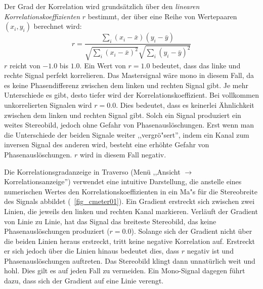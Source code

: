 Der Grad der Korrelation wird grundsätzlich über den \emph{linearen Korrelationskoeffizienten} $r$ bestimmt, der über eine Reihe von Wertepaaren $(x_i,y_i)$ berechnet wird:
\[
r = \frac{\sum\limits_{i}(x_i - \bar{x})(y_i - \bar{y})}{\sqrt{\sum\limits_{i}(x_i - \bar{x})^2} \sqrt{\sum\limits_{i}(y_i - \bar{y})^2}}
\]
$r$ reicht von $-1.0$ bis $1.0$. Ein Wert von $r = 1.0$ bedeutet, dass das linke und rechte Signal perfekt korrelieren. Das Mastersignal wäre mono in diesem Fall, da es keine Phasendifferenz zwischen dem linken und rechten Signal gibt. Je mehr Unterschiede es gibt, desto tiefer wird der Korrelationskoeffizient. Bei vollkommen unkorrelierten Signalen wird $r = 0.0$. Dies bedeutet, dass es keinerlei Ähnlichkeit zwischen dem linken und rechten Signal gibt. Solch ein Signal produziert ein weites Stereobild, jedoch ohne Gefahr von Phasenauslöschungen. Erst wenn man die Unterschiede der beiden Signale weiter ,,vergrö"sert'', indem ein Kanal zum inversen Signal des anderen wird, besteht eine erhöhte Gefahr von Phasenauslöschungen. $r$ wird in diesem Fall negativ.

Die Korrelationsgradanzeige in Traverso (Menü ,,Ansicht $\rightarrow$ Korrelationsanzeige'') verwendet eine intuitive Darstellung, die anstelle eines numerischen Wertes den Korrelationskoeffizienten in ein Ma"s für die Stereobreite des Signals abbildet (\FigB\ \ref{fig_cmeter01}). Ein Gradient erstreckt sich zwischen zwei Linien, die jeweils den linken und rechten Kanal markieren. Verläuft der Gradient von Linie zu Linie, hat das Signal das breiteste Stereobild, das keine Phasenauslöschungen produziert ($r = 0.0$). Solange sich der Gradient nicht über die beiden Linien heraus erstreckt, tritt keine negative Korrelation auf. Erstreckt er sich jedoch über die Linien hinaus bedeutet dies, dass $r$ negativ ist und Phasenauslöschungen auftreten. Das Stereobild klingt dann unnatürlich weit und hohl. Dies gilt es auf jeden Fall zu vermeiden. Ein Mono-Signal dagegen führt dazu, dass sich der Gradient auf eine Linie verengt.

